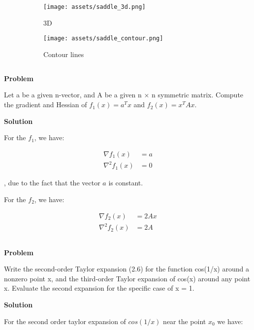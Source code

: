 \documentclass[a4paper,11pt]{article}
\numberwithin{equation}{section} %
\begin{document}
\begin{figure}[h!]
     \centering
     \begin{subfigure}[b]{0.45\textwidth}
         \centering
         \texttt{[image: assets/saddle\_3d.png]}
         \caption{3D}
     \end{subfigure}
     \hfill
     \begin{subfigure}[b]{0.45\textwidth}
         \centering
         \texttt{[image: assets/saddle\_contour.png]}
         \caption{Contour lines}
     \end{subfigure}
    \caption{}
\end{figure}

\subsection{}

\textbf{Problem}

Let a be a given n-vector, and A be a given n × n symmetric matrix. Compute the
gradient and Hessian of $f_1(x) = a^T x$ and $f_2(x) = x^TAx$.

\textbf{Solution}

For the $f_1$, we have:

\begin{align}
    \nabla f_1(x) &= a \\
    \nabla^2 f_1(x) &= 0
\end{align}

, due to the fact that the vector $a$ is constant.

For the $f_2$, we have:

\begin{align}
    \nabla f_2(x) &= 2Ax \\
    \nabla^2 f_2(x) &= 2A
\end{align}

\subsection{}

\textbf{Problem}

Write the second-order Taylor expansion (2.6) for the function cos(1/x) around
a nonzero point x, and the third-order Taylor expansion of cos(x) around any point x. Evaluate the second expansion for the specific case of x = 1.

\textbf{Solution}

For the second order taylor expansion of $cos(1/x)$ near the point $x_0$ we have:
\end{document}
